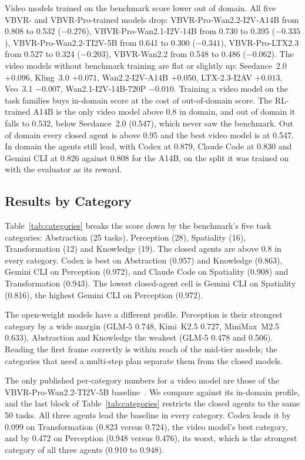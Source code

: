 Video models trained on the benchmark score lower out of domain. All five VBVR- and VBVR-Pro-trained models drop: VBVR-Pro-Wan2.2-I2V-A14B from 0.808 to 0.532 ($-0.276$), VBVR-Pro-Wan2.1-I2V-14B from 0.730 to 0.395 ($-0.335$), VBVR-Pro-Wan2.2-TI2V-5B from 0.641 to 0.300 ($-0.341$), VBVR-Pro-LTX2.3 from 0.527 to 0.324 ($-0.203$), VBVR-Wan2.2 from 0.548 to 0.486 ($-0.062$). The video models without benchmark training are flat or slightly up: Seedance~2.0 $+0.096$, Kling~3.0 $+0.071$, Wan2.2-I2V-A14B $+0.050$, LTX-2.3-I2AV $+0.013$, Veo~3.1 $-0.007$, Wan2.1-I2V-14B-720P $-0.010$. Training a video model on the task families buys in-domain score at the cost of out-of-domain score. The RL-trained A14B is the only video model above 0.8 in domain, and out of domain it falls to 0.532, below Seedance~2.0 (0.547), which never saw the benchmark. Out of domain every closed agent is above 0.95 and the best video model is at 0.547. In domain the agents still lead, with Codex at 0.879, Claude Code at 0.830 and Gemini CLI at 0.826 against 0.808 for the A14B, on the split it was trained on with the evaluator as its reward.

\subsection{Results by Category}
\label{sec:res-category}

Table~\ref{tab:categories} breaks the score down by the benchmark's five task categories: Abstraction (25 tasks), Perception (28), Spatiality (16), Transformation (12) and Knowledge (19). The closed agents are above 0.8 in every category. Codex is best on Abstraction (0.957) and Knowledge (0.863), Gemini CLI on Perception (0.972), and Claude Code on Spatiality (0.908) and Transformation (0.943). The lowest closed-agent cell is Gemini CLI on Spatiality (0.816), the highest Gemini CLI on Perception (0.972).



The open-weight models have a different profile. Perception is their strongest category by a wide margin (GLM-5 0.748, Kimi~K2.5 0.727, MiniMax~M2.5 0.633), Abstraction and Knowledge the weakest (GLM-5 0.478 and 0.506). Reading the first frame correctly is within reach of the mid-tier models; the categories that need a multi-step plan separate them from the closed models.

The only published per-category numbers for a video model are those of the VBVR-Pro-Wan2.2-TI2V-5B baseline~\citep[Table~8]{vbvrpro2026}. We compare against its in-domain profile, and the last block of Table~\ref{tab:categories} restricts the closed agents to the same 50 tasks. All three agents lead the baseline in every category. Codex leads it by 0.099 on Transformation (0.823 versus 0.724), the video model's best category, and by 0.472 on Perception (0.948 versus 0.476), its worst, which is the strongest category of all three agents (0.910 to 0.948).

